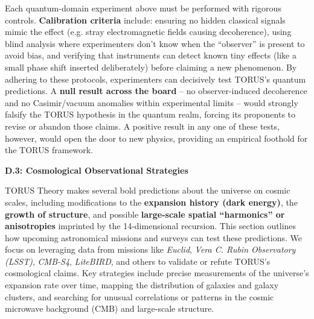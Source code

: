 \documentclass[
]{article}
\begin{document}
Each quantum-domain experiment above must be performed with rigorous
controls. \textbf{Calibration criteria} include: ensuring no hidden
classical signals mimic the effect (e.g. stray electromagnetic fields
causing decoherence), using blind analysis where experimenters don't
know when the ``observer'' is present to avoid bias, and verifying that
instruments can detect known tiny effects (like a small phase shift
inserted deliberately) before claiming a new phenomenon. By adhering to
these protocols, experimenters can decisively test TORUS's quantum
predictions. A \textbf{null result across the board} -- no
observer-induced decoherence and no Casimir/vacuum anomalies within
experimental limits -- would strongly falsify the TORUS hypothesis in
the quantum realm, forcing its proponents to revise or abandon those
claims. A positive result in any one of these tests, however, would open
the door to new physics, providing an empirical foothold for the TORUS
framework.

\textbf{D.3: Cosmological Observational Strategies}

TORUS Theory makes several bold predictions about the universe on cosmic
scales, including modifications to the \textbf{expansion history (dark
energy)}, the \textbf{growth of structure}, and possible
\textbf{large-scale spatial ``harmonics'' or anisotropies} imprinted by
the 14-dimensional recursion. This section outlines how upcoming
astronomical missions and surveys can test these predictions. We focus
on leveraging data from missions like \emph{Euclid}, \emph{Vera C. Rubin
Observatory (LSST)}, \emph{CMB-S4}, \emph{LiteBIRD}, and others to
validate or refute TORUS's cosmological claims. Key strategies include
precise measurements of the universe's expansion rate over time, mapping
the distribution of galaxies and galaxy clusters, and searching for
unusual correlations or patterns in the cosmic microwave background
(CMB) and large-scale structure.
\end{document}
